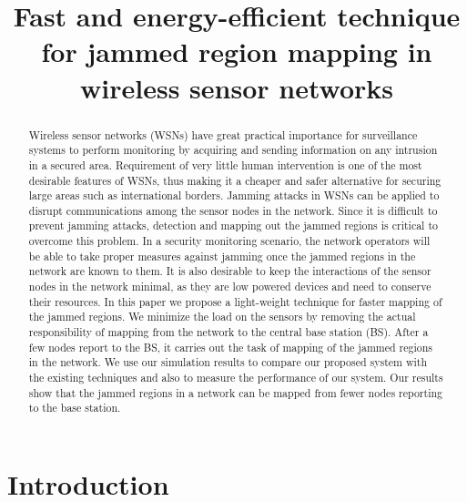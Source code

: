 \documentclass[conference]{IEEEtran}
\begin{document}
\title{Fast and energy-efficient technique for jammed region mapping in wireless sensor networks}

\author{
\and
{}
\and
{}
}

\maketitle

\begin{abstract}
Wireless sensor networks (WSNs) have great practical importance for surveillance systems to perform monitoring by acquiring and sending information on any intrusion in a secured area. Requirement of very little human intervention is one of the most desirable features of WSNs, thus making it a cheaper and safer alternative for securing large areas such as international borders. Jamming attacks in WSNs can be applied to disrupt communications among the sensor nodes in the network. Since it is difficult to prevent jamming attacks, detection and mapping out the jammed regions is critical to overcome this problem. In a security monitoring scenario, the network operators will be able to take proper measures against jamming once the jammed regions in the network are known to them. It is also desirable to keep the interactions of the sensor nodes in the network minimal, as they are low powered devices and need to conserve their resources. In this paper we propose a light-weight technique for faster mapping of the jammed regions. We minimize the load on the sensors by removing the actual responsibility of mapping from the network to the central base station (BS). After a few nodes report to the BS, it carries out the task of mapping of the jammed regions in the network. We use our simulation results to compare our proposed system with the existing techniques and also to measure the performance of our system. Our results show that the jammed regions in a network can be mapped from fewer nodes reporting to the base station.  
\end{abstract}

\section{Introduction}
\label{intro}
\end{document}
